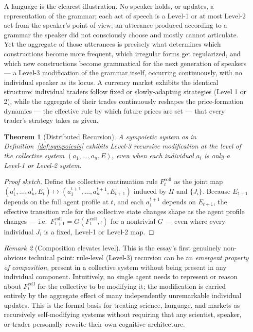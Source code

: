 \documentclass[11pt,a4paper]{article}
\theoremstyle{plain}
\newtheorem{theorem}{Theorem}[section]
\theoremstyle{definition}
\theoremstyle{remark}
\newtheorem{remark}[theorem]{Remark}
\begin{document}
A language is the clearest illustration. No speaker holds, or updates, a representation of the grammar; each act of speech is a Level-1 or at most Level-2 act from the speaker's point of view, an utterance produced according to a grammar the speaker did not consciously choose and mostly cannot articulate. Yet the aggregate of those utterances is precisely what determines which constructions become more frequent, which irregular forms get regularized, and which new constructions become grammatical for the next generation of speakers — a Level-3 modification of the grammar itself, occurring continuously, with no individual speaker as its locus. A currency market exhibits the identical structure: individual traders follow fixed or slowly-adapting strategies (Level 1 or 2), while the aggregate of their trades continuously reshapes the price-formation dynamics — the effective rule by which future prices are set — that every trader's strategy takes as given.

\begin{theorem}[Distributed Recursion]
\label{thm:distributed-recursion}
A sympoietic system as in Definition~\ref{def:sympoiesis} exhibits Level-3 recursive modification at the level of the collective system $(a_1,\ldots,a_n,E)$, even when each individual $a_i$ is only a Level-1 or Level-2 system.
\end{theorem}

\begin{proof}[Proof sketch]
Define the collective continuation rule $F^{\text{coll}}_t$ as the joint map $(a_1^t,\ldots,a_n^t,E_t) \mapsto (a_1^{t+1},\ldots,a_n^{t+1},E_{t+1})$ induced by $H$ and $\{J_i\}$. Because $E_{t+1}$ depends on the full agent profile at $t$, and each $a_i^{t+1}$ depends on $E_{t+1}$, the effective transition rule for the collective state changes shape as the agent profile changes — i.e.\ $F^{\text{coll}}_{t+1} = G(F^{\text{coll}}_t, \cdot)$ for a nontrivial $G$ — even where every individual $J_i$ is a fixed, Level-1 or Level-2 map.
\end{proof}

\begin{remark}[Composition elevates level]
\label{rem:composition-elevates}
This is the essay's first genuinely non-obvious technical point: rule-level (Level-3) recursion can be an \emph{emergent property of composition}, present in a collective system without being present in any individual component. Intuitively, no single agent needs to represent or reason about $F^{\text{coll}}_t$ for the collective to be modifying it; the modification is carried entirely by the aggregate effect of many independently unremarkable individual updates. This is the formal basis for treating science, language, and markets as recursively self-modifying systems without requiring that any scientist, speaker, or trader personally rewrite their own cognitive architecture.
\end{remark}
\end{document}
